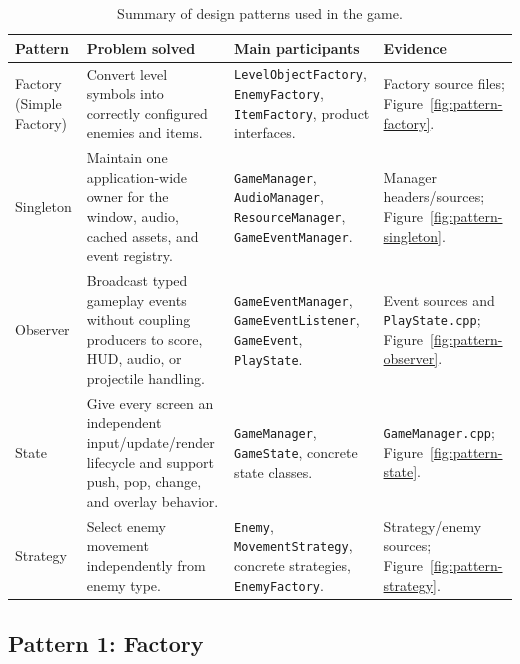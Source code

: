 \documentclass{template}
\begin{document}
\begin{table}[H]
    \centering
    \caption{Summary of design patterns used in the game.}
    \label{tab:pattern-summary}
    {\small
    \begin{tabularx}{\textwidth}{@{}
        >{\raggedright\arraybackslash}p{2.7cm}
        >{\raggedright\arraybackslash}X
        >{\raggedright\arraybackslash}X
        >{\raggedright\arraybackslash}p{3.1cm}@{}}
        \toprule
        \textbf{Pattern} & \textbf{Problem solved} &
        \textbf{Main participants} & \textbf{Evidence} \\
        \midrule
        Factory (Simple Factory) & Convert level symbols into correctly
        configured enemies and items. & \texttt{LevelObjectFactory},
        \texttt{EnemyFactory}, \texttt{ItemFactory}, product interfaces. &
        Factory source files; Figure~\ref{fig:pattern-factory}. \\
        Singleton & Maintain one application-wide owner for the window, audio,
        cached assets, and event registry. & \texttt{GameManager},
        \texttt{AudioManager}, \texttt{ResourceManager},
        \texttt{GameEventManager}. & Manager headers/sources;
        Figure~\ref{fig:pattern-singleton}. \\
        Observer & Broadcast typed gameplay events without coupling producers
        to score, HUD, audio, or projectile handling. &
        \texttt{GameEventManager}, \texttt{GameEventListener},
        \texttt{GameEvent}, \texttt{PlayState}. & Event sources and
        \texttt{PlayState.cpp}; Figure~\ref{fig:pattern-observer}. \\
        State & Give every screen an independent input/update/render lifecycle
        and support push, pop, change, and overlay behavior. &
        \texttt{GameManager}, \texttt{GameState}, concrete state classes. &
        \texttt{GameManager.cpp}; Figure~\ref{fig:pattern-state}. \\
        Strategy & Select enemy movement independently from enemy type. &
        \texttt{Enemy}, \texttt{MovementStrategy}, concrete strategies,
        \texttt{EnemyFactory}. & Strategy/enemy sources;
        Figure~\ref{fig:pattern-strategy}. \\
        \bottomrule
    \end{tabularx}
    }
\end{table}

\subsection{Pattern 1: Factory}
\end{document}
